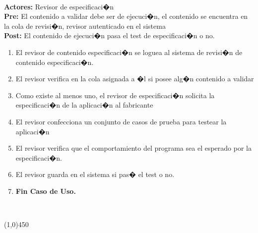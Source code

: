 \documentclass[11pt, a4paper, spanish]{article}
\begin{document}
{ \\ \textbf{Actores:} Revisor de especificaci�n \\ \textbf{Pre:} El contenido a validar debe ser de ejecuci�n, el contenido se encuentra en la cola de revisi�n, revisor autenticado en el sistema \\ \textbf{Post:} El contenido de ejecuci�n pasa el test de especificaci�n o no.\\  \begin{enumerate} \item El revisor de contenido especificaci�n se loguea al sistema de revisi�n de contenido especificaci�n. \item El revisor verifica en la cola asignada a �l si posee alg�n contenido a validar \item Como existe al menos uno, el revisor de especificaci�n solicita la especificaci�n de la aplicaci�n al fabricante \item El revisor confecciona un conjunto de casos de prueba para testear la aplicaci�n \item El revisor verifica que el comportamiento del programa sea el esperado por la especificaci�n. \item El revisor guarda en el sistema si pas� el test o no. \item \textbf{Fin Caso de Uso.} \end{enumerate}  \\  \begin{center} \line(1,0){450} \end{center}

}
\end{document}
